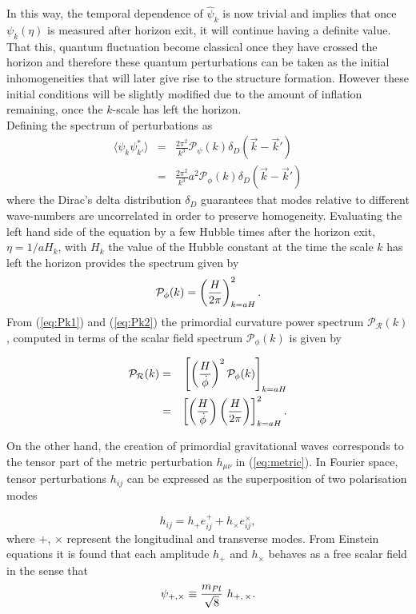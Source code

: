 \documentclass{rmaa}
\def\beq{\begin{equation}}
\def\eeq{\end{equation}}
\def\bea{\begin{eqnarray}}
\def\eea{\end{eqnarray}}
\def\cal{\mathcal}
\begin{document}
In this way, the temporal dependence of $\hat{\psi}_k$ is now trivial and 
implies that once $\psi_k\left(\eta\right)$ is measured after horizon exit, it will continue having 
a definite value. That  this, quantum fluctuation become classical once they have 
crossed the horizon and therefore these quantum perturbations can be taken as the initial 
inhomogeneities that will later give rise to the  structure formation. However 
these initial conditions will be slightly modified due to the amount of inflation remaining, 
once the $k$-scale has left the horizon.
\\

Defining the spectrum of perturbations as 
\bea
\langle\psi_k\psi^*_{k'}\rangle &=& \frac{2\pi^2}{k^3} \mathcal{P}_\psi (k)\delta_D (\vec{k}-\vec{k}')  \nonumber \\
 					&=&\frac{2\pi^2}{k^3}a^2 \mathcal{P}_\phi (k)\delta_D (\vec{k}-\vec{k}')
 \eea
where the Dirac's delta distribution $\delta_D$ guarantees that modes relative to different wave-numbers are 
uncorrelated in order to preserve homogeneity. Evaluating the left hand side of the equation by a few Hubble times after the horizon exit, 
$\eta=1/aH_k$, with $H_k$ the value of the Hubble constant at the time the scale $k$ has left the horizon
provides the spectrum given by
%
\beq\label{eq:Pk2}
\cal P_{\phi}(k)=\left( {H \over 2\pi }\right)^2_{k=aH}.
\eeq
%
From (\ref{eq:Pk1}) and (\ref{eq:Pk2})
 the  primordial curvature power spectrum $\cal P_{\cal R}(k)$, computed in terms of the scalar
 field spectrum $\cal P_{\phi}(k)$ is given by 

\begin{eqnarray}\label{eq:pspectrum}
\cal P_{\cal R}(k) &=& \left[\left({H \over \dot \phi} \right)^2 \cal P_{\phi}(k) \right]_{k=aH}  \nonumber \\
			   &= &\left[ \left({H \over \dot \phi}\right) \left({H \over 2 \pi}\right)\right]^2_{k =a H} .
\end{eqnarray}


 
On the other hand, the creation of primordial gravitational waves corresponds to the tensor 
part of the metric perturbation $h_{\mu \nu}$ in (\ref{eq:metric}). In Fourier space, 
tensor perturbations $h_{ij}$ can be expressed as the superposition of two polarisation modes

\beq
h_{ij}= h_{+}\mathit{e}^{+}_{ij}+h_{\times}\mathit{e}^{\times}_{ij},
\eeq
%
where $+$, $\times$ represent the longitudinal and transverse modes.
From Einstein equations it is found that each amplitude $h_{+}$ and $h_{\times}$
behaves as a free scalar field in the sense that
\beq
\psi_{+,\times}\equiv {m_{Pl} \over \sqrt 8}\,\,h_{+,\, \times}.
\eeq 
\end{document}
